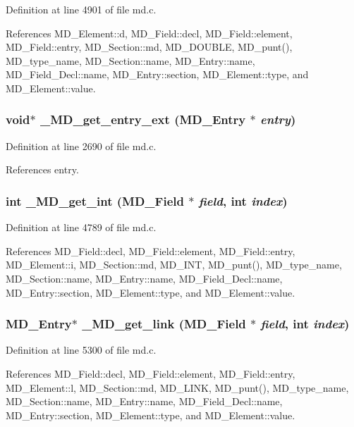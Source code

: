 Definition at line 4901 of file md.c.

References MD\_\-Element::d, MD\_\-Field::decl, MD\_\-Field::element, MD\_\-Field::entry, MD\_\-Section::md, MD\_\-DOUBLE, MD\_\-punt(), MD\_\-type\_\-name, MD\_\-Section::name, MD\_\-Entry::name, MD\_\-Field\_\-Decl::name, MD\_\-Entry::section, MD\_\-Element::type, and MD\_\-Element::value.
\subsubsection{\setlength{\rightskip}{0pt plus 5cm}void$\ast$ \_\-MD\_\-get\_\-entry\_\-ext (\bf{MD\_\-Entry} $\ast$ {\em entry})}\label{md_8c_2001829b3be52003a3b15a88869247e2}




Definition at line 2690 of file md.c.

References entry.
\subsubsection{\setlength{\rightskip}{0pt plus 5cm}int \_\-MD\_\-get\_\-int (\bf{MD\_\-Field} $\ast$ {\em field}, int {\em index})}\label{md_8c_529416a7ce86534b43b997b3b95f18b6}




Definition at line 4789 of file md.c.

References MD\_\-Field::decl, MD\_\-Field::element, MD\_\-Field::entry, MD\_\-Element::i, MD\_\-Section::md, MD\_\-INT, MD\_\-punt(), MD\_\-type\_\-name, MD\_\-Section::name, MD\_\-Entry::name, MD\_\-Field\_\-Decl::name, MD\_\-Entry::section, MD\_\-Element::type, and MD\_\-Element::value.
\subsubsection{\setlength{\rightskip}{0pt plus 5cm}\bf{MD\_\-Entry}$\ast$ \_\-MD\_\-get\_\-link (\bf{MD\_\-Field} $\ast$ {\em field}, int {\em index})}\label{md_8c_5a91daf1e0a99ee2f0ba4155360689d1}




Definition at line 5300 of file md.c.

References MD\_\-Field::decl, MD\_\-Field::element, MD\_\-Field::entry, MD\_\-Element::l, MD\_\-Section::md, MD\_\-LINK, MD\_\-punt(), MD\_\-type\_\-name, MD\_\-Section::name, MD\_\-Entry::name, MD\_\-Field\_\-Decl::name, MD\_\-Entry::section, MD\_\-Element::type, and MD\_\-Element::value.

